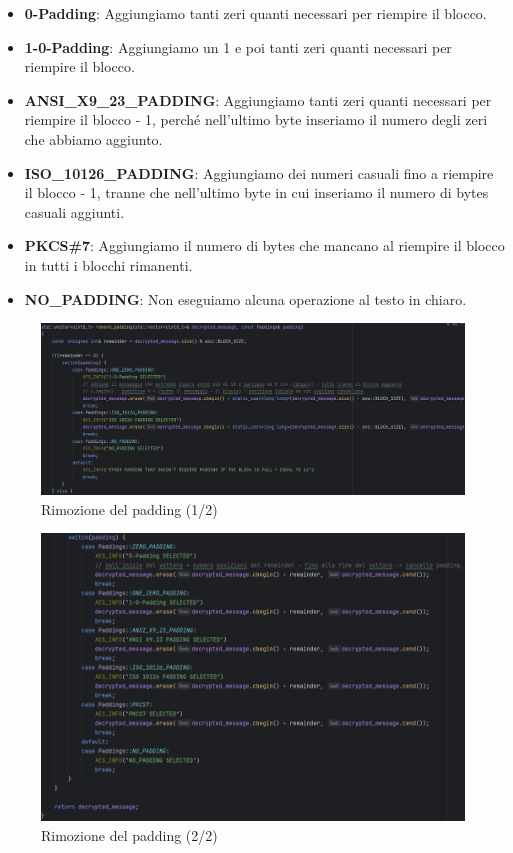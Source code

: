 \begin{itemize}
	\item \textsf{\small \textbf{0-Padding}: Aggiungiamo tanti zeri quanti necessari per riempire il blocco.}
	\item \textsf{\small \textbf{1-0-Padding}: Aggiungiamo un 1 e poi tanti zeri quanti necessari per riempire il blocco.}
	\item \textsf{\small \textbf{ANSI\_X9\_23\_PADDING}: Aggiungiamo tanti zeri quanti necessari per riempire il blocco - 1, perché nell'ultimo byte inseriamo il numero degli zeri che abbiamo aggiunto.}
	\item \textsf{\small \textbf{ISO\_10126\_PADDING}: Aggiungiamo dei numeri casuali fino a riempire il blocco - 1, tranne che nell'ultimo byte in cui inseriamo il numero di bytes casuali aggiunti.}
	\item \textsf{\small \textbf{PKCS\#7}: Aggiungiamo il numero di bytes che mancano al riempire il blocco in tutti i blocchi rimanenti.}
	\item \textsf{\small \textbf{NO\_PADDING}: Non eseguiamo alcuna operazione al testo in chiaro.}
\end{itemize}

\begin{figure}[H]
	\centering
	\includegraphics[width=1\textwidth, height=1\textheight, keepaspectratio]{./images/code/cpp/padding/remove_padding0.PNG}
	\caption{Rimozione del padding (1/2)}
	\label{fig:remove_padding0}
\end{figure}

\begin{figure}[H]
	\centering
	\includegraphics[width=1\textwidth, height=1\textheight, keepaspectratio]{./images/code/cpp/padding/remove_padding1.PNG}
	\caption{Rimozione del padding (2/2)}
	\label{fig:remove_padding1}
\end{figure}


